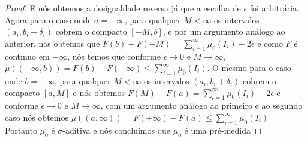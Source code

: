 \begin{proposicao}
\begin{proof}
        E nós obtemos a desigualdade reversa já que a escolha de $\epsilon$ foi arbitrária. Agora para o caso onde $a=-\infty$, para qualquer $M<\infty$ os intervalos $(a_i,b_i+\delta_i)$ cobrem o compacto $[-M,b]$, e por um argumento análogo ao anterior, nós obtemos que $F(b)-F(-M)=\sum_{i=1} ^\infty \mu_0(I_i) + 2 \epsilon$ e como $F$ é contínuo em $-\infty$, nós temos que conforme $\epsilon \to 0$ e $M \to \infty$, $\mu((-\infty,b)) = F(b) - F(-\infty) \leq  \sum_{i=1} ^\infty \mu_0(I_i) $. O mesmo para o caso onde $b=+\infty$, para qualquer $M < \infty$ os intervalos $(a_i,b_i+\delta_i)$ cobrem o compacto $[a,M]$ e nós obtemos  $F(M)-F(a)=\sum_{i=1} ^\infty \mu_0(I_i) + 2 \epsilon$ e conforme $\epsilon \to 0$ e $M \to \infty$, com um argumento análogo ao primeiro e ao segundo caso nós obtemos  $\mu((a,\infty)) = F(+\infty) - F(a) \leq  \sum_{i=1} ^\infty \mu_0(I_i)$ \\
        Portanto $\mu_0$ é $\sigma$-aditiva e nós concluímos que $\mu_0$ é uma pré-medida
    \end{proof}    
\end{proposicao}

